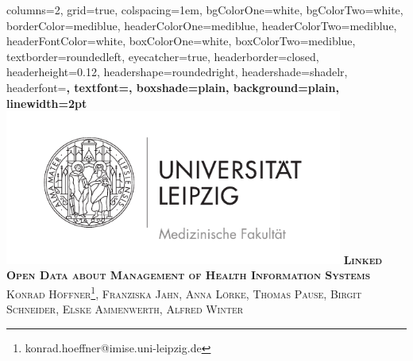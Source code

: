 \documentclass[portrait,final,a0paper,fontscale=0.310]{baposter}
\begin{document}


\begin{poster}%
  {
  columns=2,
  grid=true,
  colspacing=1em,
  bgColorOne=white,
  bgColorTwo=white,
  borderColor=mediblue,
  headerColorOne=mediblue,
  headerColorTwo=mediblue,
  headerFontColor=white,
  boxColorOne=white,
  boxColorTwo=mediblue,
  textborder=roundedleft,
  eyecatcher=true,
  headerborder=closed,
  headerheight=0.12\textheight,
  headershape=roundedright,
  headershade=shadelr,
  headerfont=\Large\bf\textsc, %
  textfont={\setlength{\parindent}{0em}},
  boxshade=plain,
  background=plain,
  linewidth=2pt
  }
  {\includegraphics[width=30em]{img/medfak.pdf}} 
  {\bf\textsc{Linked Open Data about Management of Health Information Systems}\vspace{0.5em}
  }
  {\textsc{Konrad Höffner\footnote{konrad.hoeffner@imise.uni-leipzig.de}, Franziska Jahn, Anna Lörke, Thomas Pause, Birgit Schneider, Elske
  Ammenwerth, Alfred Winter}}
  {%
  }



\end{poster}
\end{document}
